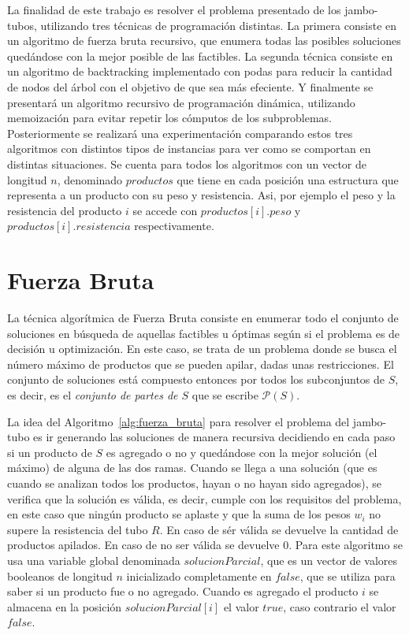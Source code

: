 \documentclass[10pt,a4paper]{article}
\begin{document}
La finalidad de este trabajo es resolver el problema presentado de los jambo-tubos, utilizando tres t\'ecnicas de programaci\'on distintas. La primera consiste en un algoritmo de fuerza bruta recursivo, que enumera todas las posibles soluciones qued\'andose con la mejor posible de las factibles. La segunda t\'ecnica consiste en un algoritmo de backtracking implementado con podas para reducir la cantidad de nodos del \'arbol con el objetivo de que sea m\'as efeciente. Y finalmente se presentar\'a un algoritmo recursivo de programaci\'on din\'amica, utilizando memoizaci\'on para evitar repetir los c\'omputos de los subproblemas. Posteriormente se realizará una experimentación comparando estos tres algoritmos con distintos tipos de instancias para ver como se comportan en distintas situaciones. Se cuenta para todos los algoritmos con un vector de longitud $n$, denominado $productos$ que tiene en cada posición una estructura que representa a un producto con su peso y resistencia. Asi, por ejemplo el peso y la resistencia del producto $i$ se accede con $productos[i].peso$ y $productos[i].resistencia$ respectivamente.

\section{Fuerza Bruta} \label{sec:fuerza_bruta}
La t\'ecnica algorítmica de  Fuerza Bruta consiste en enumerar todo el conjunto de soluciones en búsqueda de aquellas factibles u óptimas según si el problema es de decisión u optimización. En este caso, se trata de un problema donde se busca el número máximo de productos que se pueden apilar, dadas unas restricciones. El conjunto de soluciones está compuesto entonces por todos los subconjuntos de $S$, es decir, es el \emph{conjunto de partes de $S$} que se escribe $\mathcal{P}(S)$.

La idea del Algoritmo~\ref{alg:fuerza_bruta} para resolver el problema del jambo-tubo es ir generando las soluciones de manera recursiva decidiendo en cada paso si un producto de $S$ es agregado o no y quedándose con la mejor solución (el máximo) de alguna de las dos ramas. Cuando se llega a una solución (que es cuando se analizan todos los productos, hayan o no hayan sido agregados), se verifica que la solución es válida, es decir, cumple con los requisitos del problema, en este caso que ningún producto se aplaste y que la suma de los pesos $w_i$ no supere la resistencia del tubo $R$. En caso de sér válida se devuelve la cantidad de productos apilados. En caso de no ser válida se devuelve 0. Para este algoritmo se usa una variable global denominada $solucionParcial$, que es un vector de valores booleanos de longitud $n$ inicializado completamente en $false$, que se utiliza para saber si un producto fue o no agregado. Cuando es agregado el producto $i$ se almacena en la posición $solucionParcial[i]$ el valor $true$, caso contrario el valor $false$.
\end{document}
